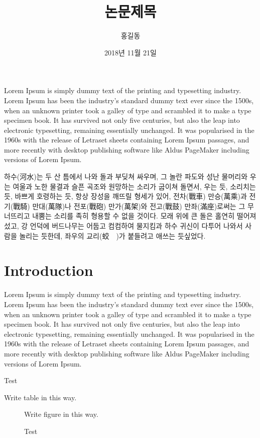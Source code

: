 \documentclass{thesis-SJ}
\title[English title]{논문제목}
\author[洪吉東]{홍길동}{Hong, Gil Dong}
\date{2018년 11월 21일}{November 21st, 2018}
\begin{document}
	\EnglishAbstract
	
	Lorem Ipsum is simply dummy text of the printing and typesetting industry. Lorem Ipsum has been the industry's standard dummy text ever since the 1500s, when an unknown printer took a galley of type and scrambled it to make a type specimen book. It has survived not only five centuries, but also the leap into electronic typesetting, remaining essentially unchanged. It was popularised in the 1960s with the release of Letraset sheets containing Lorem Ipsum passages, and more recently with desktop publishing software like Aldus PageMaker including versions of Lorem Ipsum.
	
	
	\KoreanAbstract
	
	하수(河水)는 두 산 틈에서 나와 돌과 부딪쳐 싸우며, 그 놀란 파도와 성난 물머리와 우는 여울과 노한 물결과 슬픈 곡조와 원망하는 소리가 굽이쳐 돌면서, 우는 듯, 소리치는 듯, 바쁘게 호령하는 듯, 항상 장성을 깨뜨릴 형세가 있어, 전차(戰車) 만승(萬乘)과 전기(戰騎) 만대(萬隊)나 전포(戰砲) 만가(萬架)와 전고(戰鼓) 만좌(滿座)로써는 그 무너뜨리고 내뿜는 소리를 족히 형용할 수 없을 것이다. 모래 위에 큰 돌은 홀연히 떨어져 섰고, 강 언덕에 버드나무는 어둡고 컴컴하여 물지킴과 하수 귀신이 다투어 나와서 사람을 놀리는 듯한데, 좌우의 교리(蛟　)가 붙들려고 애쓰는 듯싶었다.
	
	
	\tableofcontents
	
	\mainpartstart
	
	\chapter{Introduction} 
	
	Lorem Ipsum is simply dummy text of the printing and typesetting industry. Lorem Ipsum has been the industry's standard dummy text ever since the 1500s, when an unknown printer took a galley of type and scrambled it to make a type specimen book. It has survived not only five centuries, but also the leap into electronic typesetting, remaining essentially unchanged. It was popularised in the 1960s with the release of Letraset sheets containing Lorem Ipsum passages, and more recently with desktop publishing software like Aldus PageMaker including versions of Lorem Ipsum.
	
	\begin{table}
		\caption{Test}
		Write table in this way. 
	\end{table}
	
	
	\begin{figure}
		Write figure in this way. 
		\caption{Test}
	\end{figure}
\end{document}
